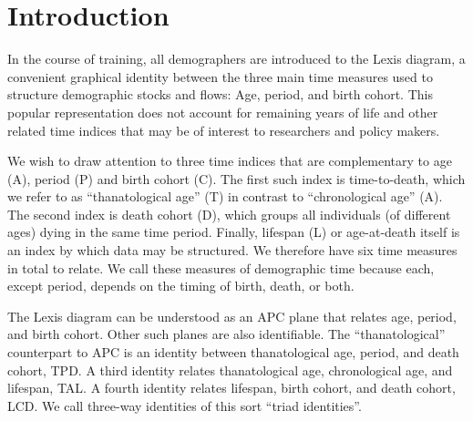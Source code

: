 \documentclass[12pt,oneside,a4paper]{article} %
\begin{document}
\section{Introduction}
In the course of training, all demographers are introduced
to the Lexis diagram, a convenient graphical identity between the three main
time measures used to structure demographic stocks and flows: Age, period, and birth cohort.
This popular representation does not account for remaining years of life and
other related time indices that may be of interest to researchers and
policy makers. %

We wish to draw attention to three time indices that are complementary to age
(A), period (P) and birth cohort (C). The first such index is time-to-death,
which we refer to as ``thanatological age'' (T) in contrast to ``chronological
age'' (A). The second index is death cohort (D), which groups all individuals
(of different ages) dying in the same time period. Finally, lifespan (L) or
age-at-death itself is an index by which data may be structured.
We therefore have six time measures in total to relate. We call these measures of demographic
time because each, except period, depends on the timing of birth, death, or
both.

The Lexis diagram can be understood as an APC plane
that relates age, period, and birth cohort. Other such planes are
also identifiable.
The ``thanatological'' counterpart to APC is an identity between thanatological
age, period, and death cohort, TPD. A third identity relates thanatological age,
chronological age, and lifespan, TAL. A fourth identity relates lifespan, birth
cohort, and death cohort, LCD. We call three-way identities of this sort ``triad identities''.
\end{document}
